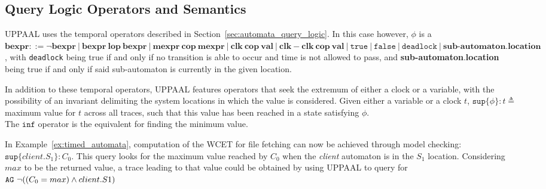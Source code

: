 \iffalse
\begin{definition}[Synchronizations]
In regards to actions performed during a transition, the emitter's actions
are performed prior to that of the receivers. This makes it possible for the
emitter to store a value in a variable, and have the receiver read that new
value within a single step, much like a message being passed.
\end{definition}
\fi


\subsection{Query Logic Operators and Semantics}
\label{sec:uppaal_queries}
UPPAAL uses the temporal operators described in
Section~\ref{sec:automata_query_logic}. In this case however, $\phi$ is
a
$
\textbf{bexpr} ::= \allowbreak
   \neg \textbf{bexpr} \allowbreak
   ~|~ \textbf{bexpr}~\textbf{lop}~\textbf{bexpr} \allowbreak
   ~|~ \textbf{mexpr}~\textbf{cop}~\textbf{mexpr} \allowbreak
   ~|~ \textbf{clk}~\textbf{cop}~\textbf{val} \allowbreak
   ~|~ \textbf{clk} - \textbf{clk}~\textbf{cop}~\textbf{val} \allowbreak
   ~|~ \texttt{true} \allowbreak
   ~|~ \texttt{false} \allowbreak
   ~|~ \texttt{deadlock} \allowbreak
   ~|~ \textbf{sub-automaton}.\textbf{location} \allowbreak
$,
with \texttt{deadlock} being true if and only if no transition is able to occur
and time is not allowed to pass, and \textbf{sub-automaton}.\textbf{location}
being true if and only if said sub-automaton is currently in the given
location.

In addition to these temporal operators, UPPAAL features operators that seek
the extremum of either a clock or a variable, with the possibility of an
invariant delimiting the system locations in which the value is considered. Given
either a variable or a clock $t$,
$\texttt{sup}\{\phi\}: t \triangleq$
maximum value for $t$ across all traces, such that this value has been reached
in a state satisfying $\phi$.\\
The $\texttt{inf}$ operator is the equivalent for finding the minimum value.

\begin{example}
In Example~\ref{ex:timed_automata}, computation of the WCET for file fetching
can now be achieved through model checking:
$\texttt{sup}\{\textit{client}.S_1\}: C_0$.  This query looks for the maximum
value reached by $C_0$ when the \textit{client} automaton is in the $S_1$
location.
Considering $max$ to be the returned value, a trace leading to that value could
be obtained by using UPPAAL to query
for $\text{\texttt{AG}}{}{}~\neg((C_0 = max) \land client.S1)$
\end{example}
